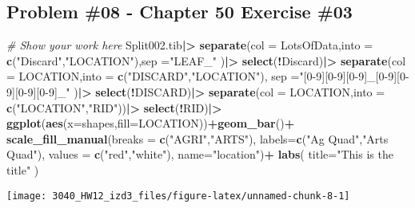 \documentclass[
]{article}
\newenvironment{Shaded}{\begin{snugshade}}{\end{snugshade}}
\newcommand{\AttributeTok}[1]{\textcolor[rgb]{0.13,0.29,0.53}{#1}}
\newcommand{\CommentTok}[1]{\textcolor[rgb]{0.56,0.35,0.01}{\textit{#1}}}
\newcommand{\FunctionTok}[1]{\textcolor[rgb]{0.13,0.29,0.53}{\textbf{#1}}}
\newcommand{\NormalTok}[1]{#1}
\newcommand{\SpecialCharTok}[1]{\textcolor[rgb]{0.81,0.36,0.00}{\textbf{#1}}}
\newcommand{\StringTok}[1]{\textcolor[rgb]{0.31,0.60,0.02}{#1}}
\begin{document}
\newpage

\hypertarget{problem-08---chapter-50-exercise-03}{%
\subsection{Problem \#08 - Chapter 50 Exercise
\#03}\label{problem-08---chapter-50-exercise-03}}

\begin{Shaded}
\begin{Highlighting}[]
\CommentTok{\# Show your work here}
\NormalTok{Split002.tib}\SpecialCharTok{|\textgreater{}}
  \FunctionTok{separate}\NormalTok{(}\AttributeTok{col =}\NormalTok{ LotsOfData,}\AttributeTok{into =} \FunctionTok{c}\NormalTok{(}\StringTok{"Discard"}\NormalTok{,}\StringTok{"LOCATION"}\NormalTok{),}\AttributeTok{sep =}\StringTok{"LEAF\_"}\NormalTok{ )}\SpecialCharTok{|\textgreater{}}
  \FunctionTok{select}\NormalTok{(}\SpecialCharTok{!}\NormalTok{Discard)}\SpecialCharTok{|\textgreater{}}
  \FunctionTok{separate}\NormalTok{(}\AttributeTok{col =}\NormalTok{ LOCATION,}\AttributeTok{into =} \FunctionTok{c}\NormalTok{(}\StringTok{"DISCARD"}\NormalTok{,}\StringTok{"LOCATION"}\NormalTok{),}
           \AttributeTok{sep =}\StringTok{"[0{-}9][0{-}9][0{-}9]\_[0{-}9][0{-}9][0{-}9][0{-}9]\_"}\NormalTok{ )}\SpecialCharTok{|\textgreater{}}
  \FunctionTok{select}\NormalTok{(}\SpecialCharTok{!}\NormalTok{DISCARD)}\SpecialCharTok{|\textgreater{}}
  \FunctionTok{separate}\NormalTok{(}\AttributeTok{col =}\NormalTok{ LOCATION,}\AttributeTok{into =} \FunctionTok{c}\NormalTok{(}\StringTok{"LOCATION"}\NormalTok{,}\StringTok{"RID"}\NormalTok{))}\SpecialCharTok{|\textgreater{}}
  \FunctionTok{select}\NormalTok{(}\SpecialCharTok{!}\NormalTok{RID)}\SpecialCharTok{|\textgreater{}}
  \FunctionTok{ggplot}\NormalTok{(}\FunctionTok{aes}\NormalTok{(}\AttributeTok{x=}\NormalTok{shapes,}\AttributeTok{fill=}\NormalTok{LOCATION))}\SpecialCharTok{+}\FunctionTok{geom\_bar}\NormalTok{()}\SpecialCharTok{+}
  \FunctionTok{scale\_fill\_manual}\NormalTok{(}\AttributeTok{breaks =} \FunctionTok{c}\NormalTok{(}\StringTok{"AGRI"}\NormalTok{,}\StringTok{"ARTS"}\NormalTok{),}
                    \AttributeTok{labels=}\FunctionTok{c}\NormalTok{(}\StringTok{"Ag Quad"}\NormalTok{,}\StringTok{"Arts Quad"}\NormalTok{),}
                    \AttributeTok{values =} \FunctionTok{c}\NormalTok{(}\StringTok{"red"}\NormalTok{,}\StringTok{"white"}\NormalTok{),}
                    \AttributeTok{name=}\StringTok{"location"}\NormalTok{)}\SpecialCharTok{+}
  \FunctionTok{labs}\NormalTok{(}
    \AttributeTok{title=}\StringTok{"This is the title"}
\NormalTok{  )}
\end{Highlighting}
\end{Shaded}

\texttt{[image: 3040\_HW12\_izd3\_files/figure-latex/unnamed-chunk-8-1]}
\end{document}
